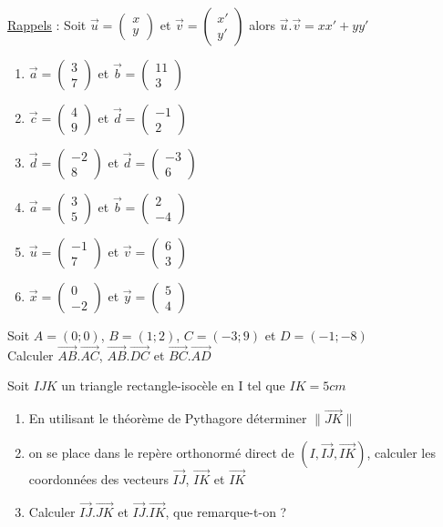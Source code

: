 \documentclass[11pt]{article}
\newcommand{\vecteur}[3]{
$\vec{#1} = \begin{pmatrix} #2 \\ #3 \end{pmatrix}$}
\begin{document}
\begin{exercice}
\underline{Rappels} : Soit $ \vec{u} = \begin{pmatrix} x \\ y \end{pmatrix} $ et $\vec{v} = \begin{pmatrix} x' \\ y' \end{pmatrix}$ alors $\vec{u}
. \vec{v} = xx' + yy'$

\begin{multicols}{2}
\begin{enumerate}
\item $\vec{a} = \begin{pmatrix} 3 \\ 7 \end{pmatrix}$ et
$\vec{b} = \begin{pmatrix} 11 \\ 3 \end{pmatrix}$
\item \vecteur{c}{4}{9} et \vecteur{d}{-1}{2}
\item \vecteur{d}{-2}{8} et \vecteur{d}{-3}{6}
\item \vecteur{a}{3}{5} et \vecteur{b}{2}{-4}  
\item \vecteur{u}{-1}{7} et \vecteur{v}{6}{3}  
\item \vecteur{x}{0}{-2} et \vecteur{y}{5}{4}
\end{enumerate}
\end{multicols}
\end{exercice}

\begin{exercice}
Soit $A=(0;0)$, $B=(1;2)$, $C=(-3;9)$ et $D=(-1;-8)$ \\
Calculer $\vec{AB}.\vec{AC}$, $\vec{AB}.\vec{DC}$ et $\vec{BC}.\vec{AD}$
\end{exercice}

\begin{exercice}
Soit $IJK$ un triangle rectangle-isocèle en I tel que $IK=5cm$
\begin{enumerate}
\item En utilisant le théorème de Pythagore déterminer
$\|\vec{JK}\|$
\item on se place dans le repère orthonormé direct de
$(I,\vec{IJ},\vec{IK})$, calculer les coordonnées des vecteurs
$\vec{IJ}$, $\vec{IK}$ et $\vec{IK}$
\item Calculer $\vec{IJ}.\vec{JK}$ et $\vec{IJ}.\vec{IK}$, que remarque-t-on ?
\end{enumerate}
\end{exercice}
\end{document}
